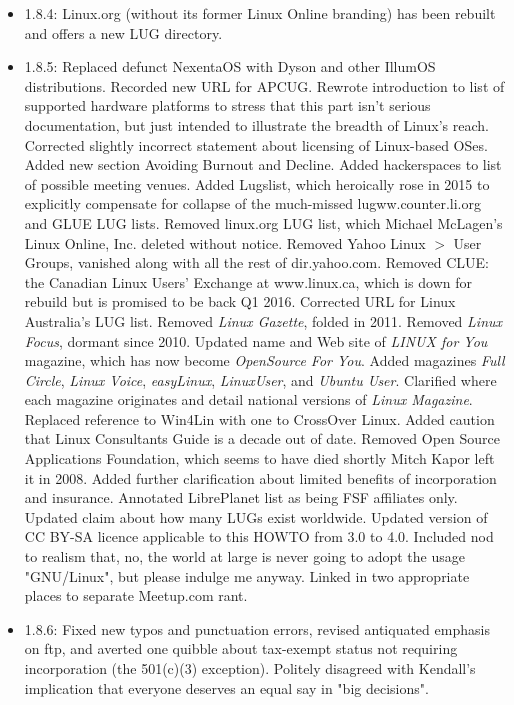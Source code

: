 \begin{itemize}
\item 1.8.4:  Linux.org (without its former Linux Online branding) has been rebuilt and offers a new LUG directory.
\item 1.8.5:  Replaced defunct NexentaOS with Dyson and other
IllumOS distributions.  Recorded new URL for APCUG.  Rewrote introduction
to list of supported hardware platforms to stress that this part isn't
serious documentation, but just intended to illustrate the breadth of
Linux's reach.  Corrected slightly incorrect statement about licensing of
Linux-based OSes.  Added new section Avoiding Burnout and Decline.
Added hackerspaces to list of possible meeting venues.  Added Lugslist, which
heroically rose in 2015 to explicitly compensate for collapse of the
much-missed lugww.counter.li.org and GLUE LUG lists.  Removed linux.org
LUG list, which Michael McLagen's Linux Online, Inc. deleted without notice.
Removed Yahoo Linux $>$ User Groups, vanished along with all the rest of
dir.yahoo.com.  Removed CLUE: the Canadian Linux Users' Exchange at 
www.linux.ca, which is down for rebuild but is promised to be back Q1
2016.  Corrected URL for Linux Australia's LUG list.  Removed {\itshape Linux
Gazette\/}, folded in 2011.  Removed {\itshape Linux Focus\/}, dormant
since 2010.  Updated name and Web site of {\itshape LINUX for You\/} magazine, which has now become {\itshape OpenSource For You\/}.
Added magazines {\itshape Full Circle\/}, {\itshape Linux Voice\/},
{\itshape easyLinux\/}, {\itshape LinuxUser\/}, and {\itshape Ubuntu User\/}.
Clarified where each magazine originates and detail national versions of
{\itshape Linux Magazine\/}.  Replaced reference to Win4Lin with one to CrossOver
Linux.  Added caution that Linux Consultants Guide is a decade out of
date.  Removed Open Source Applications Foundation, which seems to have
died shortly Mitch Kapor left it in 2008.  Added further clarification 
about limited benefits of incorporation and insurance.  Annotated LibrePlanet 
list as being FSF affiliates only.  Updated claim about how many LUGs 
exist worldwide.  Updated version of CC BY-SA licence applicable to this 
HOWTO from 3.0 to 4.0.  Included nod to realism that, no, the world at large
is never going to adopt the usage "GNU/Linux", but please indulge me anyway.
Linked in two appropriate places to separate Meetup.com rant.
\item 1.8.6:  Fixed new typos and punctuation errors, revised antiquated emphasis on ftp, and averted one quibble about tax-exempt status not requiring incorporation (the 501(c)(3) exception).  Politely disagreed with Kendall's implication that everyone deserves an equal say in "big decisions".

\end{itemize}

